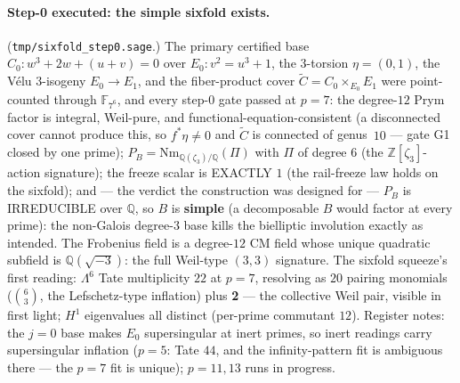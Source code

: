 \documentclass[11pt]{article}
\theoremstyle{definition}
\theoremstyle{remark}
\begin{document}
\paragraph{Step-0 executed: the simple sixfold exists.}
(\texttt{tmp/sixfold\_step0.sage}.)  The primary certified base
$C_0\colon w^3+2w+(u+v)=0$ over $E_0\colon v^2=u^3+1$, the
$3$-torsion $\eta=(0,1)$, the V\'elu $3$-isogeny $E_0\to E_1$, and
the fiber-product cover $\widetilde C=C_0\times_{E_0}E_1$ were
point-counted through $\mathbb{F}_{7^6}$, and every step-0 gate
passed at $p=7$: the degree-$12$ Prym factor is integral,
Weil-pure, and functional-equation-consistent (a disconnected cover
cannot produce this, so $f^*\eta\neq0$ and $\widetilde C$ is
connected of genus~$10$ --- gate G1 closed by one prime);
$P_B=\mathrm{Nm}_{\mathbb{Q}(\zeta_3)/\mathbb{Q}}(\Pi)$ with $\Pi$ of
degree $6$ (the $\mathbb{Z}[\zeta_3]$-action signature); the freeze
scalar is EXACTLY $1$ (the rail-freeze law holds on the sixfold);
and --- the verdict the construction was designed for ---
$P_B$ is IRREDUCIBLE over $\mathbb{Q}$, so $B$ is \textbf{simple}
(a decomposable $B$ would factor at every prime): the non-Galois
degree-$3$ base kills the bielliptic involution exactly as intended.
The Frobenius field is a degree-$12$ CM field whose unique quadratic
subfield is $\mathbb{Q}(\sqrt{-3})$: the full Weil-type $(3,3)$
signature.  The sixfold squeeze's first reading:
$\Lambda^6$ Tate multiplicity $22$ at $p=7$, resolving as $20$
pairing monomials ($\binom{6}{3}$, the Lefschetz-type inflation)
plus \textbf{2} --- the collective Weil pair, visible in first
light; $H^1$ eigenvalues all distinct (per-prime commutant $12$).
Register notes: the $j=0$ base makes $E_0$ supersingular at inert
primes, so inert readings carry supersingular inflation ($p=5$:
Tate $44$, and the infinity-pattern fit is ambiguous there --- the
$p=7$ fit is unique); $p=11,13$ runs in progress.
\end{document}
